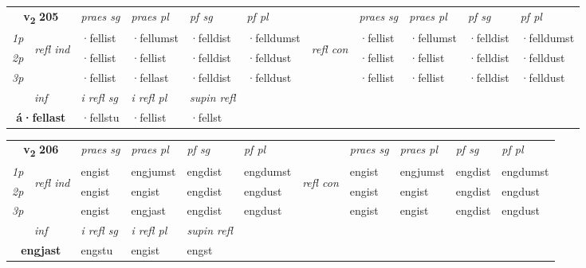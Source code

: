 \noindent
\begin{tabular}{lllllllllll} \toprule
\multicolumn{2}{c}{\textbf{v{\textsubscript{2}}} \Large{\textbf{205}}}  &  \textit{praes sg}  & \textit{praes pl}  &\textit{ pf sg} & \textit{pf pl} &  &  \textit{praes sg}  & \textit{praes pl}  & \textit{pf sg} & \textit{pf pl } \\*
	\cmidrule{3-6} \cmidrule{8-11}
 {\textit{1p}} & \multirow{3}{*}{\begin{turn}{90}\textit{refl ind}\end{turn}}  & ·fellist & ·fellumst & ·felldist & ·felldumst & \multirow{3}{*}{\begin{turn}{90}\textit{refl con}\end{turn}}  &·fellist & ·fellumst & ·felldist & ·felldumst \\*
 {\textit{2p}} &  & ·fellist & ·fellist & ·felldist & ·felldust & &·fellist & ·fellist & ·felldist & ·felldust \\*
 {\textit{3p}}  & & ·fellist & ·fellast & ·felldist & ·felldust & & ·fellist & ·fellist& ·felldist & ·felldust \\*
\cmidrule{3-6} \cmidrule{8-11}

   \multicolumn{2}{c}{\textit{inf}}   & \textit{i refl sg} & \textit{i refl pl}   & \textit{supin refl}  \\*
  \multicolumn{2}{c}{\textbf{á\allowbreak ·fellast}}    & ·fellstu & ·fellist   & ·fellst  \\*
\end{tabular}

\noindent
\begin{tabular}{lllllllllll} \toprule
\multicolumn{2}{c}{\textbf{v{\textsubscript{2}}} \Large{\textbf{206}}}  &  \textit{praes sg}  & \textit{praes pl}  &\textit{ pf sg} & \textit{pf pl} &  &  \textit{praes sg}  & \textit{praes pl}  & \textit{pf sg} & \textit{pf pl } \\*
	\cmidrule{3-6} \cmidrule{8-11}
 {\textit{1p}} & \multirow{3}{*}{\begin{turn}{90}\textit{refl ind}\end{turn}}  & engist & engjumst & engdist & engdumst & \multirow{3}{*}{\begin{turn}{90}\textit{refl con}\end{turn}}  &engist & engjumst & engdist & engdumst \\*
 {\textit{2p}} &  & engist & engist & engdist & engdust & &engist & engist & engdist & engdust \\*
 {\textit{3p}}  & & engist & engjast & engdist & engdust & & engist & engist& engdist & engdust \\*
\cmidrule{3-6} \cmidrule{8-11}

   \multicolumn{2}{c}{\textit{inf}}   & \textit{i refl sg} & \textit{i refl pl}   & \textit{supin refl}  \\*
  \multicolumn{2}{c}{\textbf{engjast}}    & engstu & engist   & engst  \\*
\end{tabular}

